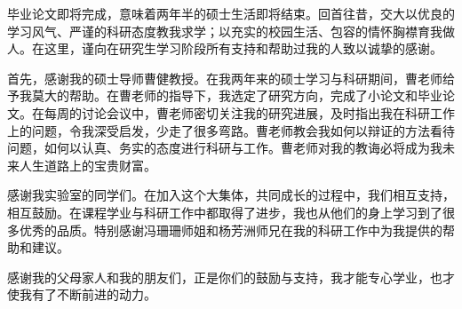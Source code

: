 \begin{thanks}

毕业论文即将完成，意味着两年半的硕士生活即将结束。回首往昔，交大以优良的学习风气、严谨的科研态度教我求学；以充实的校园生活、包容的情怀胸襟育我做人。在这里，谨向在研究生学习阶段所有支持和帮助过我的人致以诚挚的感谢。

首先，感谢我的硕士导师曹健教授。在我两年来的硕士学习与科研期间，曹老师给予我莫大的帮助。在曹老师的指导下，我选定了研究方向，完成了小论文和毕业论文。在每周的讨论会议中，曹老师密切关注我的研究进展，及时指出我在科研工作上的问题，令我深受启发，少走了很多弯路。曹老师教会我如何以辩证的方法看待问题，如何以认真、务实的态度进行科研与工作。曹老师对我的教诲必将成为我未来人生道路上的宝贵财富。

感谢我实验室的同学们。在加入这个大集体，共同成长的过程中，我们相互支持，相互鼓励。在课程学业与科研工作中都取得了进步，我也从他们的身上学习到了很多优秀的品质。特别感谢冯珊珊师姐和杨芳洲师兄在我的科研工作中为我提供的帮助和建议。

感谢我的父母家人和我的朋友们，正是你们的鼓励与支持，我才能专心学业，也才使我有了不断前进的动力。
\end{thanks}
